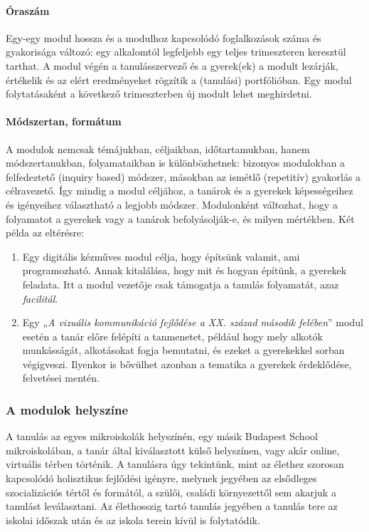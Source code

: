 \paragraph{Óraszám} Egy-egy modul hossza és a modulhoz kapcsolódó foglalkozások száma és gyakorisága változó: egy alkalomtól legfeljebb egy teljes trimeszteren keresztül tarthat. A modul végén a tanulásszervező és a gyerek(ek) a modult lezárják, értékelik és az elért eredményeket rögzítik a (tanulási) portfólióban. Egy modul folytatásaként a következő trimeszterben új modult lehet meghirdetni.

\paragraph{Módszertan, formátum} A modulok nemcsak témájukban, céljaikban, időtartamukban, hanem módszertanukban, folyamataikban is különbözhetnek: bizonyos modulokban a felfedeztető (inquiry based) módszer, másokban az ismétlő (repetitív) gyakorlás a célravezető. Így mindig a modul céljához, a tanárok és a gyerekek képességeihez és igényeihez választható a legjobb módszer. Modulonként változhat, hogy a folyamatot a gyerekek vagy a tanárok befolyásolják-e, és milyen mértékben. Két példa az eltérésre:

\begin{enumerate}
      \item Egy digitális kézműves modul célja, hogy építsünk valamit, ami programozható. Annak kitalálása, hogy mit és hogyan építünk, a gyerekek feladata. Itt a modul vezetője csak támogatja a tanulás folyamatát, azaz \emph{facilitál}.

      \item Egy „\emph{A vizuális kommunikáció fejlődése a XX. század második felében}'' modul esetén a tanár előre felépíti a tanmenetet, például hogy mely alkotók munkásságát, alkotásokat fogja bemutatni, és ezeket a gyerekekkel sorban végigveszi. Ilyenkor is bővülhet azonban a tematika a gyerekek érdeklődése, felvetései mentén.

\end{enumerate}



\subsubsection{A modulok helyszíne}

A tanulás az egyes mikroiskolák helyszínén, egy másik Budapest School mikroiskolában, a tanár által kiválasztott külső helyszínen, vagy akár online, virtuális térben történik. A tanulásra úgy tekintünk, mint az élethez szorosan kapcsolódó holisztikus fejlődési igényre, melynek jegyében az elsődleges szocializációs tértől és formától, a szülői, családi környezettől sem akarjuk a tanulást leválasztani. Az élethosszig tartó tanulás jegyében a tanulás tere az iskolai időszak után és az iskola terein kívül is folytatódik.

